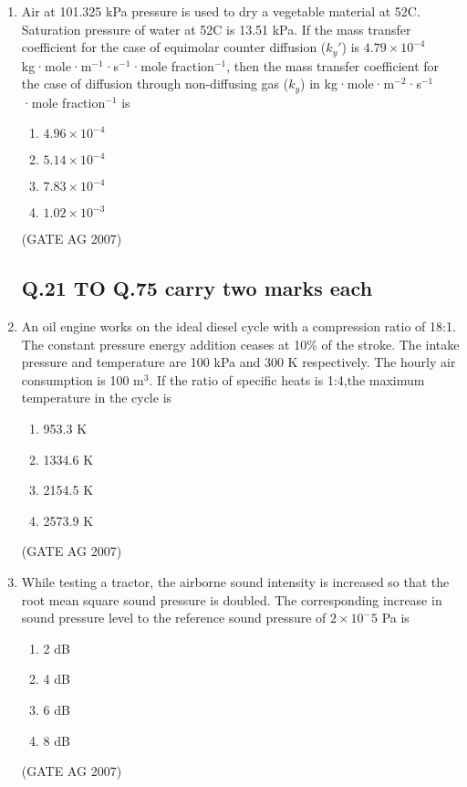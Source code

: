 \documentclass[journal,12pt,onecolumn]{IEEEtran}
\theoremstyle{remark}
\begin{document}
\begin{enumerate}
\item  Air at 101.325 kPa pressure is used to dry a vegetable material at 52\degree C. Saturation pressure of water at 52\degree C is 13.51 kPa. If the mass transfer coefficient for the case of equimolar counter diffusion ($k_y'$) is $4.79 \times 10^{-4}$ kg·mole·m$^{-1}$·s$^{-1}$·mole fraction$^{-1}$, then the mass transfer coefficient for the case of diffusion through non-diffusing gas ($k_y$) in kg·mole·m$^{-2}$·s$^{-1}$·mole fraction$^{-1}$ is
\begin{multicols}{4}
\begin{enumerate}
    \item $4.96 \times 10^{-4}$
    \item $5.14 \times 10^{-4}$
    \item $7.83 \times 10^{-4}$
    \item $1.02 \times 10^{-3}$
\end{enumerate}
\end{multicols}
\hfill(GATE AG 2007)



 \subsection*{Q.21 TO Q.75 carry two marks each}

\item  An oil engine works on the ideal diesel cycle with a compression ratio of 18:1. The constant pressure energy addition ceases at 10\% of the stroke. The intake pressure and temperature are 100 kPa and 300 K respectively. The hourly air consumption is 100 m$^3$. If the ratio of specific heats is 1:4,the maximum temperature in the cycle is 
\begin{multicols}{4}
\begin{enumerate}
    \item 953.3 K
    \item 1334.6 K
    \item 2154.5 K
    \item 2573.9 K
\end{enumerate}
\end{multicols}
\hfill(GATE AG 2007)

\item  While testing a tractor, the airborne sound intensity is increased so that the root mean square sound pressure is doubled. The corresponding increase in sound pressure level to the reference sound pressure of $2 \times 10^-5$ Pa is
\begin{multicols}{4}
\begin{enumerate}
    \item 2 dB
    \item 4 dB
    \item 6 dB
    \item 8 dB
\end{enumerate}
\end{multicols}
\hfill(GATE AG 2007)


\end{enumerate}
\end{document}
